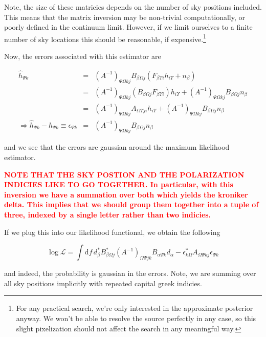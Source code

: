 \documentclass[10pt]{article}
\begin{document}
Note, the size of these matricies depends on the number of sky positions included. This means that the matrix inversion may be non-trivial computationally, or poorly defined in the continuum limit. However, if we limit ourselves to a finite number of sky locations this should be reasonable, if expensive.\footnote{For any practical search, we're only interested in the approximate posterior anyway. We won't be able to resolve the source perfectly in any case, so this slight pixelization should not affect the search in any meaningful way.}

Now, the errors associated with this estimator are

\begin{eqnarray}
\hat{h}_{\Psi k} & = & \left(A^{-1}\right)_{\Psi\Omega k j} B_{\beta \Omega j} \left( F_{\beta \Upsilon i} h_{i\Upsilon} + n_\beta \right) \\
                 & = & \left(A^{-1}\right)_{\Psi\Omega k j} \left( B_{\beta \Omega j} F_{\beta \Upsilon i} \right) h_{i\Upsilon} +  \left(A^{-1}\right)_{\Psi\Omega k j} B_{\beta \Omega j} n_\beta \\
                 & = & \left(A^{-1}\right)_{\Psi\Omega k j} A_{\Omega\Upsilon j i} h_{i\Upsilon} +  \left(A^{-1}\right)_{\Psi\Omega k j} B_{\beta \Omega j} n_\beta \\
\Rightarrow \hat{h}_{\Psi k} - h_{\Psi k} \equiv \epsilon_{\Psi k} & = & \left(A^{-1}\right)_{\Psi\Omega k j} B_{\beta \Omega j} n_\beta
\end{eqnarray}

and we see that the errors are gaussian around the maximum likelihood estimator.

\textcolor{red}{\textbf{NOTE THAT THE SKY POSTION AND THE POLARIZATION INDICIES LIKE TO GO TOGETHER. In particular, with this inversion we have a summation over both which yields the kroniker delta. This implies that we should group them together into a tuple of three, indexed by a single letter rather than two indicies.}}

If we plug this into our likelihood functional, we obtain the following 

\begin{equation}
\log \mathcal{L} = \int\mathrm{d}f\, d_\beta^\ast B_{\beta\Omega j}^\ast \left( A^{-1}\right)_{\Omega\Psi j k} B_{\alpha\Psi k} d_\alpha - \epsilon_{k\Omega}^\ast A_{\Omega\Psi k j} \epsilon_{\Psi k}
\end{equation}

and indeed, the probability is gaussian in the errors. Note, we are summing over all sky positions implicitly with repeated capital greek indicies. 
\end{document}
